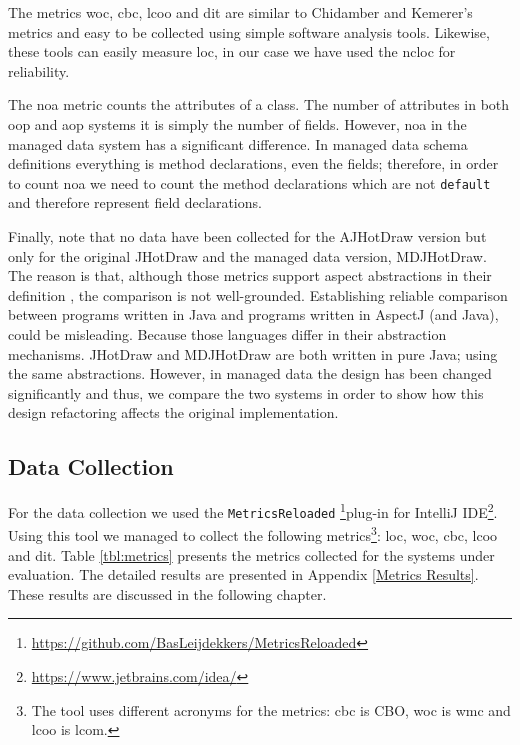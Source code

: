 The metrics \ac{woc}, \ac{cbc}, \ac{lcoo} and \ac{dit} are similar to Chidamber and Kemerer's metrics and easy to be collected using simple software analysis tools.
Likewise, these tools can easily measure \ac{loc}, in our case we have used the \ac{ncloc} for reliability.

The \ac{noa} metric counts the attributes of a class.
The number of attributes in both \ac{oop} and \ac{aop} systems it is simply the number of fields.
However, \ac{noa} in the managed data system has a significant difference.
In managed data schema definitions everything is method declarations, even the fields; therefore, in order to count \ac{noa} we need to count the method declarations which are not \texttt{default} and therefore represent field declarations.

Finally, note that no data have been collected for the AJHotDraw version but only for the original JHotDraw and the managed data version, MDJHotDraw.
The reason is that, although those metrics support aspect abstractions in their definition \cite{sant2003reuse}, the comparison is not well-grounded.
Establishing reliable comparison between programs written in Java and programs written in AspectJ (and Java), could be misleading.
Because those languages differ in their abstraction mechanisms.
JHotDraw and MDJHotDraw are both written in pure Java; using the same abstractions.
However, in managed data the design has been changed significantly and thus, we compare the two systems in order to show how this design refactoring affects the original implementation.

\subsection{Data Collection}
For the data collection we used the \texttt{MetricsReloaded} \footnote{
	\url{https://github.com/BasLeijdekkers/MetricsReloaded}}plug-in for IntelliJ IDE\footnote{\url{https://www.jetbrains.com/idea/}}.
Using this tool we managed to collect the following metrics\footnote{
	The tool uses different acronyms \cite{chidamber1994metrics} for the metrics: \ac{cbc} is CBO, \ac{woc} is \ac{wmc} and \ac{lcoo} is \ac{lcom}.
}: \ac{loc}, \ac{woc}, \ac{cbc}, \ac{lcoo} and \ac{dit}.
Table \ref{tbl:metrics} presents the metrics collected for the systems under evaluation.
The detailed results are presented in Appendix \ref{Metrics Results}. 
These results are discussed in the following chapter.

